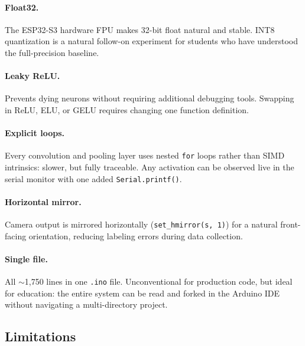 \documentclass[12pt]{article}
\begin{document}
\paragraph{Float32.}
The ESP32-S3 hardware FPU makes 32-bit float natural and stable.
INT8 quantization is a natural follow-on experiment for students who have
understood the full-precision baseline.

\paragraph{Leaky ReLU.}
Prevents dying neurons without requiring additional debugging tools.
Swapping in ReLU, ELU, or GELU requires changing one function definition.

\paragraph{Explicit loops.}
Every convolution and pooling layer uses nested \texttt{for} loops rather than
SIMD intrinsics: slower, but fully traceable.
Any activation can be observed live in the serial monitor with one added
\texttt{Serial.printf()}.

\paragraph{Horizontal mirror.}
Camera output is mirrored horizontally (\texttt{set\_hmirror(s,~1)}) for a
natural front-facing orientation, reducing labeling errors during data
collection.

\paragraph{Single file.}
All $\sim$1,750 lines in one \texttt{.ino} file.
Unconventional for production code, but ideal for education: the entire system
can be read and forked in the Arduino IDE without navigating a multi-directory
project.

\subsection{Limitations}
\label{subsec:limitations}
\end{document}
